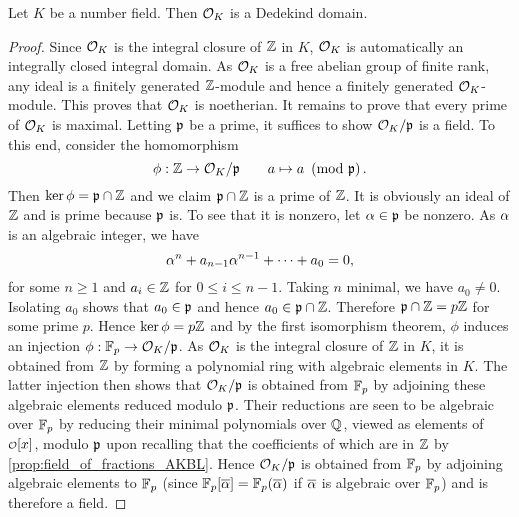     \begin{theorem}\label{thm:ring_of_integers_is_Dedekind}
      Let $K$ be a number field. Then $\mathcal{O}_{K}$ is a Dedekind domain.
    \end{theorem}
    \begin{proof}
      Since $\mathcal{O}_{K}$ is the integral closure of $\mathbb{Z}$ in $K$, $\mathcal{O}_{K}$ is automatically an integrally closed integral domain. As $\mathcal{O}_{K}$ is a free abelian group of finite rank, any ideal is a finitely generated $\mathbb{Z}$-module and hence a finitely generated $\mathcal{O}_{K}$-module. This proves that $\mathcal{O}_{K}$ is noetherian. It remains to prove that every prime of $\mathcal{O}_{K}$ is maximal. Letting $\mathfrak{p}$ be a prime, it suffices to show $\mathcal{O}_{K}/\mathfrak{p}$ is a field. To this end, consider the homomorphism
      \[
        \phi:\mathbb{Z} \to \mathcal{O}_{K}/\mathfrak{p} \qquad a \mapsto a \ \left(\text{mod }\mathfrak{p}\right).
      \]
      Then $\ker\phi = \mathfrak{p} \cap \mathbb{Z}$ and we claim $\mathfrak{p} \cap \mathbb{Z}$ is a prime of $\mathbb{Z}$. It is obviously an ideal of $\mathbb{Z}$ and is prime because $\mathfrak{p}$ is. To see that it is nonzero, let $\alpha \in \mathfrak{p}$ be nonzero. As $\alpha$ is an algebraic integer, we have
      \[
        \alpha^{n}+a_{n-1}\alpha^{n-1}+\cdots+a_{0} = 0,
      \]
      for some $n \ge 1$ and $a_{i} \in \mathbb{Z}$ for $0 \le i \le n-1$. Taking $n$ minimal, we have $a_{0} \neq 0$. Isolating $a_{0}$ shows that $a_{0} \in \mathfrak{p}$ and hence $a_{0} \in \mathfrak{p} \cap \mathbb{Z}$. Therefore $\mathfrak{p} \cap \mathbb{Z} = p\mathbb{Z}$ for some prime $p$. Hence $\ker\phi = p\mathbb{Z}$ and by the first isomorphism theorem, $\phi$ induces an injection $\phi:\mathbb{F}_{p} \to \mathcal{O}_{K}/\mathfrak{p}$. As $\mathcal{O}_{K}$ is the integral closure of $\mathbb{Z}$ in $K$, it is obtained from $\mathbb{Z}$ by forming a polynomial ring with algebraic elements in $K$. The latter injection then shows that $\mathcal{O}_{K}/\mathfrak{p}$ is obtained from $\mathbb{F}_{p}$ by adjoining these algebraic elements reduced modulo $\mathfrak{p}$. Their reductions are seen to be algebraic over $\mathbb{F}_{p}$ by reducing their minimal polynomials over $\mathbb{Q}$, viewed as elements of $\smc{O}[x]$, modulo $\mathfrak{p}$ upon recalling that the coefficients of which are in $\mathbb{Z}$ by \cref{prop:field_of_fractions_AKBL}. Hence $\mathcal{O}_{K}/\mathfrak{p}$ is obtained from $\mathbb{F}_{p}$ by adjoining algebraic elements to $\mathbb{F}_{p}$ (since $\mathbb{F}_{p}[\overline{\alpha}] = \mathbb{F}_{p}(\overline{\alpha})$ if $\overline{\alpha}$ is algebraic over $\mathbb{F}_{p}$) and is therefore a field.
    \end{proof}

